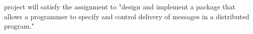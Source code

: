 \documentclass[10pt,journal,compsoc]{IEEEtran}
\begin{document}
\maketitle


\IEEEdisplaynontitleabstractindextext



\IEEEpeerreviewmaketitle







% 
% 
% 
% 
 project will satisfy the assignment to "design and implement a package that allows a programmer to specify and control delivery of messages in a distributed program."
\end{document}
